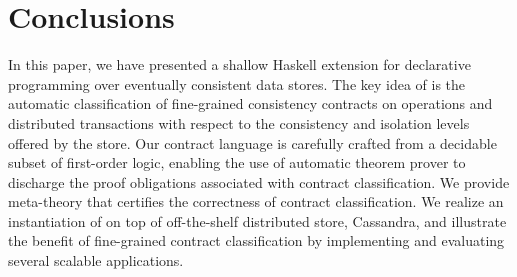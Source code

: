 \section{Conclusions}
\label{sec:concl}

In this paper, we have presented \name a shallow Haskell extension for
declarative programming over eventually consistent data stores. The key idea of
\name is the automatic classification of fine-grained consistency contracts on
operations and distributed transactions with respect to the consistency and
isolation levels offered by the store. Our contract language is carefully
crafted from a decidable subset of first-order logic, enabling the use of
automatic theorem prover to discharge the proof obligations associated with
contract classification. We provide meta-theory that certifies the correctness
of contract classification. We realize an instantiation of \name on top of
off-the-shelf distributed store, Cassandra, and illustrate the benefit of
fine-grained contract classification by implementing and evaluating several
scalable applications.
